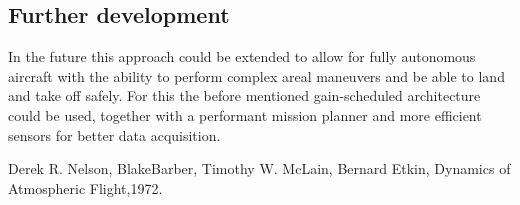 \documentclass[twocolumn,showpacs,
    nofootinbib,aps,superscriptaddress,
    eqsecnum,prd,showkeys,10pt,floatfix]{revtex4}
\begin{document}
\subsection*{Further development}
In the future this approach could be extended to allow for fully autonomous
aircraft with the ability to perform complex areal maneuvers and be able to
land and take off safely. For this the before mentioned gain-scheduled
architecture could be used, together with a performant mission planner and more
efficient sensors for better data acquisition.
\begin{thebibliography}{20}
    Derek R. Nelson, BlakeBarber, Timothy W. McLain,
    Bernard Etkin, Dynamics of Atmospheric Flight,1972.


\end{thebibliography}
\end{document}
